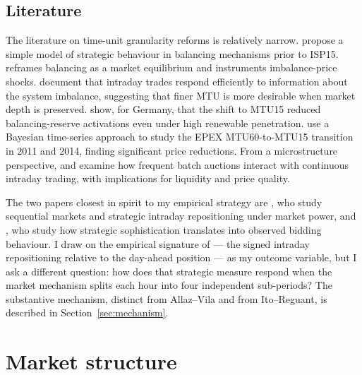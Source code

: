 \documentclass[11pt,a4paper]{article}
\begin{document}
\subsection{Literature}

The literature on time-unit granularity reforms is relatively narrow. \citet{JustWeber2015} propose a simple model of strategic behaviour in balancing mechanisms prior to ISP15. \citet{Eicke2021} reframes balancing as a market equilibrium and instruments imbalance-price shocks. \citet{KochMaskos2020} document that intraday trades respond efficiently to information about the system imbalance, suggesting that finer MTU is more desirable when market depth is preserved. \citet{KochHirth2019} show, for Germany, that the shift to MTU15 reduced balancing-reserve activations even under high renewable penetration. \citet{MaerkleHuss2018} use a Bayesian time-series approach to study the EPEX MTU60-to-MTU15 transition in 2011 and 2014, finding significant price reductions. From a microstructure perspective, \citet{Graf2024} and \citet{Neuhoff2016} examine how frequent batch auctions interact with continuous intraday trading, with implications for liquidity and price quality.

The two papers closest in spirit to my empirical strategy are \citet{ItoReguant2016}, who study sequential markets and strategic intraday repositioning under market power, and \citet{Hortacsu2017}, who study how strategic sophistication translates into observed bidding behaviour. I draw on the empirical signature of \citet{ItoReguant2016} --- the signed intraday repositioning relative to the day-ahead position --- as my outcome variable, but I ask a different question: how does that strategic measure respond when the market mechanism splits each hour into four independent sub-periods? The substantive mechanism, distinct from Allaz--Vila and from Ito--Reguant, is described in Section~\ref{sec:mechanism}.

\section{Market structure}
\end{document}

